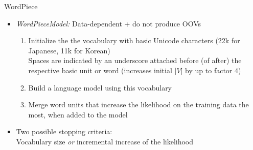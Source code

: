 \begin{frame}{WordPiece}

\vfill

	\begin{itemize}
		\item \textit{WordPieceModel:} Data-dependent + do not produce OOVs
			\begin{enumerate}
				\item Initialize the the vocabulary with basic Unicode characters (22k for Japanese, 11k for Korean)\\
							\warning Spaces are indicated by an underscore attached before (of after) the respective basic unit or word (increases initial $|V|$ by up to factor 4)
				\item Build a language model using this vocabulary
				\item Merge word units that increase the likelihood on the training data the most, when added to the model
			\end{enumerate}
		\item Two possible stopping criteria:\\Vocabulary size \textit{or} incremental increase of the likelihood
	\end{itemize}
	
\vfill

\end{frame}


